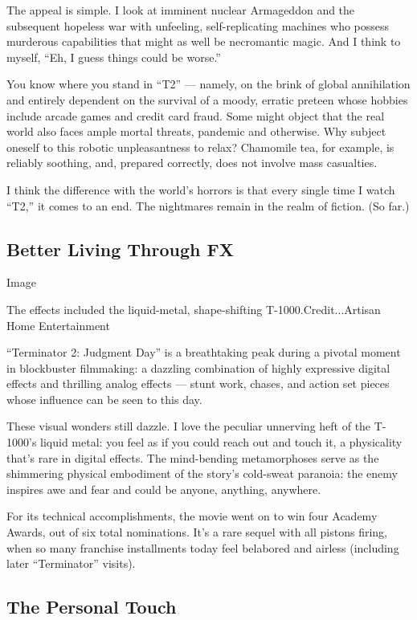 The appeal is simple. I look at imminent nuclear Armageddon and the
subsequent hopeless war with unfeeling, self-replicating machines who
possess murderous capabilities that might as well be necromantic magic.
And I think to myself, ``Eh, I guess things could be worse.''

You know where you stand in ``T2'' --- namely, on the brink of global
annihilation and entirely dependent on the survival of a moody, erratic
preteen whose hobbies include arcade games and credit card fraud. Some
might object that the real world also faces ample mortal threats,
pandemic and otherwise. Why subject oneself to this robotic
unpleasantness to relax? Chamomile tea, for example, is reliably
soothing, and, prepared correctly, does not involve mass casualties.

I think the difference with the world's horrors is that every single
time I watch ``T2,'' it comes to an end. The nightmares remain in the
realm of fiction. (So far.)

\hypertarget{better-living-through-fx}{%
\subsection{Better Living Through FX}\label{better-living-through-fx}}

Image

The effects included the liquid-metal, shape-shifting
T-1000.Credit...Artisan Home Entertainment

``Terminator 2: Judgment Day'' is a breathtaking peak during a pivotal
moment in blockbuster filmmaking: a dazzling combination of highly
expressive digital effects and thrilling analog effects --- stunt work,
chases, and action set pieces whose influence can be seen to this day.

These visual wonders still dazzle. I love the peculiar unnerving heft of
the T-1000's liquid metal: you feel as if you could reach out and touch
it, a physicality that's rare in digital effects. The mind-bending
metamorphoses serve as the shimmering physical embodiment of the story's
cold-sweat paranoia: the enemy inspires awe and fear and could be
anyone, anything, anywhere.

For its technical accomplishments, the movie went on to win four Academy
Awards, out of six total nominations. It's a rare sequel with all
pistons firing, when so many franchise installments today feel belabored
and airless (including later ``Terminator'' visits).

\hypertarget{the-personal-touch}{%
\subsection{The Personal Touch}\label{the-personal-touch}}


